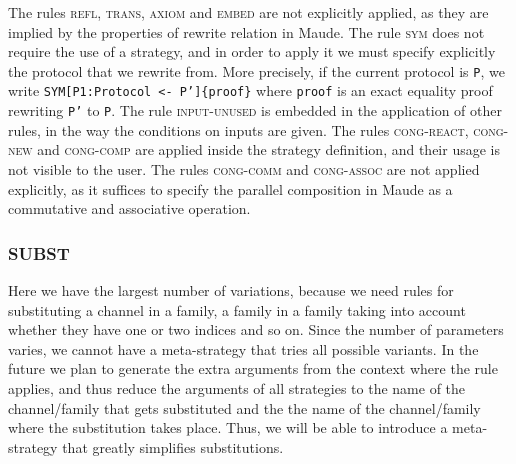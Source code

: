 The rules \textsc{refl}, \textsc{trans}, \textsc{axiom} and
\textsc{embed} are not explicitly applied, as they are implied by
the properties of rewrite relation in Maude. 
The rule \textsc{sym} does not require the use of a strategy, and
in order to apply it we must specify explicitly the protocol that we 
rewrite from. More precisely, if the current protocol is \texttt{P}, 
we write \texttt{SYM[P1:Protocol <- P']\{proof\}} where 
\texttt{proof} is an
exact equality proof rewriting \texttt{P'} to \texttt{P}. 
The rule
\textsc{input-unused} is embedded in the application of other rules,
in the way the conditions on inputs are given.
The rules \textsc{cong-react}, \textsc{cong-new} and \textsc{cong-comp}
are applied inside the strategy definition, and their usage is not visible
to the user. The rules \textsc{cong-comm} and
\textsc{cong-assoc} are not applied explicitly, as
it suffices to specify the parallel composition in Maude as a commutative
and associative operation.

\subsubsection{SUBST}

Here we have the largest number of variations, because we need rules for
substituting a channel in a family, a family in a family taking into 
account whether they have one or two indices and so on. Since the number
of parameters varies, we cannot have a meta-strategy that tries all
possible variants. In the future we plan to generate the extra
arguments from the context where the rule applies, and thus reduce the arguments of all strategies to the name of the channel/family that gets
substituted and the the name of the channel/family where the 
substitution takes place. Thus, we will be able to introduce a
meta-strategy that greatly simplifies substitutions.

